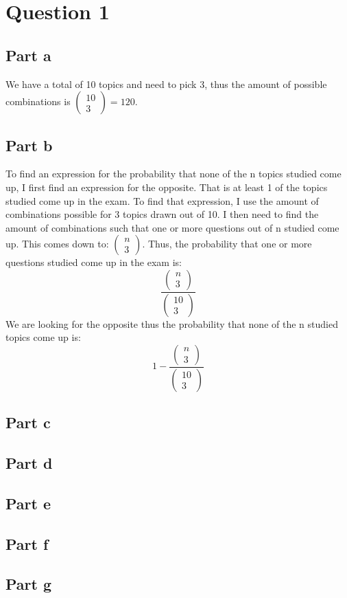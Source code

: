 \documentclass[14.5pt]{article}
\begin{document}
\section*{Question 1}
\subsection*{Part a}

We have a total of 10 topics and need to pick 3, thus the amount of possible combinations
is $\begin{pmatrix} 10 \\ 3 \end{pmatrix} = 120$.

\subsection*{Part b}

To find an expression for the probability that none of the n topics studied come up,
I first find an expression for the opposite. That is at least 1 of the topics studied
come up in the exam.
To find that expression, I use the amount of combinations possible for 3 topics drawn out
of 10. I then need to find the amount of combinations such that one or more questions out
of n studied come up. This comes down to: $\begin{pmatrix} n \\ 3 \end{pmatrix}$.
Thus, the probability that one or more questions studied come up in the exam is:
\begin{equation}
    \frac{\begin{pmatrix} n \\ 3 \end{pmatrix}}{\begin{pmatrix} 10 \\ 3 \end{pmatrix}}
\end{equation}
We are looking for the opposite thus the probability that none of the n studied topics come up is:
\begin{equation}
    1 - \frac{\begin{pmatrix} n \\ 3 \end{pmatrix}}{\begin{pmatrix} 10 \\ 3 \end{pmatrix}}
\end{equation}
\subsection*{Part c}
\subsection*{Part d}
\subsection*{Part e}
\subsection*{Part f}
\subsection*{Part g}
\end{document}
